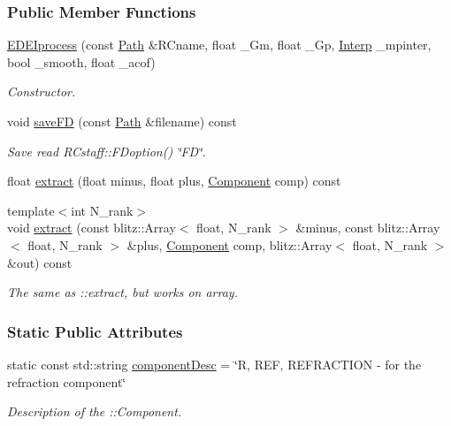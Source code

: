 \subsubsection*{Public Member Functions}
\begin{DoxyCompactItemize}
\item 
\hyperlink{group__edeiedei_ga8516a2db50344f5d80f2a2fb8a870534}{EDEIprocess} (const \hyperlink{classPath}{Path} \&RCname, float \_\-Gm, float \_\-Gp, \hyperlink{classInterp}{Interp} \_\-mpinter, bool \_\-smooth, float \_\-acof)
\begin{DoxyCompactList}\small\item\em Constructor. \item\end{DoxyCompactList}\item 
void \hyperlink{group__edeiedei_gae6f313c662a444a4bf5516cf9f83dc8c}{saveFD} (const \hyperlink{classPath}{Path} \&filename) const 
\begin{DoxyCompactList}\small\item\em Save read RCstaff::FDoption() \char`\"{}FD\char`\"{}. \item\end{DoxyCompactList}\item 
float \hyperlink{group__edeiedei_gabc1c9c24e29e022479a8e74c8bc7e86a}{extract} (float minus, float plus, \hyperlink{classEDEIprocess_a745d55d7f97f3aafa52998d49d9acde4}{Component} comp) const 
\item 
{\footnotesize template$<$int N\_\-rank$>$ }\\void \hyperlink{group__edeiedei_gaa8f414bd247177bd9f58be27c716fab9}{extract} (const blitz::Array$<$ float, N\_\-rank $>$ \&minus, const blitz::Array$<$ float, N\_\-rank $>$ \&plus, \hyperlink{classEDEIprocess_a745d55d7f97f3aafa52998d49d9acde4}{Component} comp, blitz::Array$<$ float, N\_\-rank $>$ \&out) const 
\begin{DoxyCompactList}\small\item\em The same as ::extract, but works on array. \item\end{DoxyCompactList}\end{DoxyCompactItemize}
\subsubsection*{Static Public Attributes}
\begin{DoxyCompactItemize}
\item 
static const std::string \hyperlink{group__edeiedei_ga6222a7fc19bf117145380f89e64292c8}{componentDesc} = \char`\"{}R, REF, REFRACTION -\/ for the refraction component\char`\"{}
\begin{DoxyCompactList}\small\item\em Description of the ::Component. \item\end{DoxyCompactList}\end{DoxyCompactItemize}
